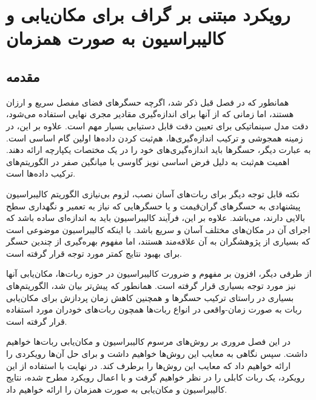 
\chapter{رویکرد مبتنی بر گراف برای مکان‌یابی و کالیبراسیون به صورت همزمان}

\section{مقدمه}
همانطور که در فصل قبل ذکر شد، اگرچه حسگرهای فضای مفصل سریع و ارزان هستند، اما زمانی که از آنها برای اندازه‌گیری مقادیر مجری نهایی استفاده می‌شود، دقت مدل سینماتیکی برای تعیین دقت قابل دستیابی بسیار مهم است. علاوه بر این، در زمینه همجوشی و ترکیب اندازه‌گیری‌ها، هم‌ثبت کردن داده‌ها
\cite{hall1997introduction} 
 اولین گام اساسی است. به عبارت دیگر، حسگرها باید اندازه‌گیری‌های خود را در یک مختصات یکپارچه ارائه دهند. اهمیت هم‌ثبت به دلیل فرض اساسی نویز گاوسی با میانگین صفر در الگوریتم‌های ترکیب داده‌ها است.
 
 نکته قابل توجه دیگر برای ربات‌های آسان نصب، لزوم بی‌نیازی الگوریتم کالیبراسیون پیشنهادی به حسگرهای گران‌قیمت و یا حسگرهایی که نیاز به تعمیر و نگهداری سطح بالایی دارند، می‌باشد. علاوه بر این، فرآیند کالیبراسیون باید به اندازه‌ای ساده باشد که اجرای آن در مکان‌های مختلف آسان و سریع باشد. با اینکه کالیبراسیون موضوعی است که بسیاری از پژوهشگران به آن علاقه‌مند هستند، اما مفهوم بهره‌گیری از چندین حسگر برای بهبود نتایج کمتر مورد توجه قرار گرفته است.
 

از طرفی دیگر، افزون بر مفهوم و ضرورت کالیبراسیون در حوزه ربات‌ها، مکان‌یابی آنها نیز مورد توجه بسیاری قرار گرفته است. همانطور که پیش‌تر بیان شد، الگوریتم‌های بسیاری در راستای ترکیب حسگرها و همچنین کاهش زمان پردازش برای مکان‌یابی ربات به صورت زمان-واقعی در انواع ربات‌ها همچون ربات‌های خودران مورد استفاده قرار گرفته است.

در این فصل مروری بر روش‌های مرسوم کالیبراسیون و مکان‌یابی ربات‌ها خواهیم داشت. سپس نگاهی به معایب این روش‌ها خواهیم داشت و برای حل آن‌ها رویکردی را ارائه خواهیم داد که معایب این روش‌ها را برطرف کند. در نهایت با استفاده از این رویکرد، یک ربات کابلی را در نظر خواهیم گرفت و با اعمال رویکرد مطرح شده، نتایج کالیبراسیون و مکان‌یابی به صورت همزمان را ارائه خواهیم داد.

